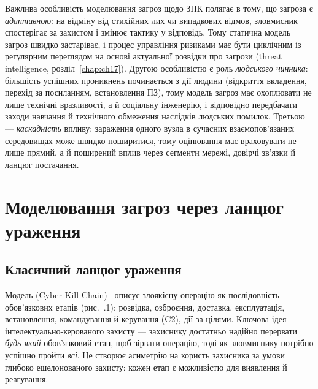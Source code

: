 Важлива особливість моделювання загроз щодо ЗПК полягає в тому, що загроза є \emph{адаптивною}: на відміну від стихійних лих чи випадкових відмов, зловмисник спостерігає за захистом і змінює тактику у відповідь. Тому статична модель загроз швидко застаріває, і процес управління ризиками має бути циклічним із регулярним переглядом на основі актуальної розвідки про загрози (threat intelligence, розділ~\ref{chap:ch17}). Другою особливістю є роль \emph{людського чинника}: більшість успішних проникнень починається з дії людини (відкриття вкладення, перехід за посиланням, встановлення ПЗ), тому модель загроз має охоплювати не лише технічні вразливості, а й соціальну інженерію, і відповідно передбачати заходи навчання й технічного обмеження наслідків людських помилок. Третьою --- \emph{каскадність} впливу: зараження одного вузла в сучасних взаємопов'язаних середовищах може швидко поширитися, тому оцінювання має враховувати не лише прямий, а й поширений вплив через сегменти мережі, довірчі зв'язки й ланцюг постачання.

\section{Моделювання загроз через ланцюг ураження}\label{sec:ch04-killchain}

\subsection{Класичний ланцюг ураження}

Модель  (Cyber Kill Chain)~\cite{lockheed-kc} описує злоякісну операцію як послідовність обов'язкових етапів (рис.~\thechapter.1): розвідка, озброєння, доставка, експлуатація, встановлення, командування й керування (C2), дії за цілями. Ключова ідея інтелектуально-керованого захисту --- захиснику достатньо надійно перервати \emph{будь-який} обов'язковий етап, щоб зірвати операцію, тоді як зловмиснику потрібно успішно пройти \emph{всі}. Це створює асиметрію на користь захисника за умови глибоко ешелонованого захисту: кожен етап є можливістю для виявлення й реагування.

\begin{tikzfig}
\end{tikzfig}

